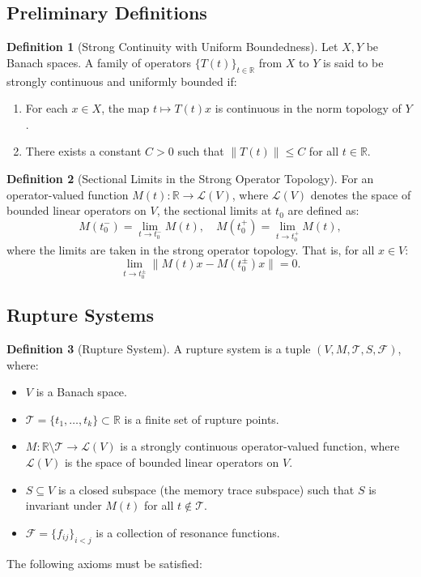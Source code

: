 \documentclass[12pt]{article}
\theoremstyle{definition}
\newtheorem{definition}{Definition}
\theoremstyle{plain}
\begin{document}
\subsection{Preliminary Definitions}

\begin{definition}[Strong Continuity with Uniform Boundedness]
Let \( X, Y \) be Banach spaces. A family of operators \( \{T(t)\}_{t \in \mathbb{R}} \) from \( X \) to \( Y \) is said to be strongly continuous and uniformly bounded if:
\begin{enumerate}
    \item For each \( x \in X \), the map \( t \mapsto T(t)x \) is continuous in the norm topology of \( Y \).
    \item There exists a constant \( C > 0 \) such that \( \|T(t)\| \leq C \) for all \( t \in \mathbb{R} \).
\end{enumerate}
\end{definition}

\begin{definition}[Sectional Limits in the Strong Operator Topology]
For an operator-valued function \( M(t): \mathbb{R} \to \mathcal{L}(V) \), where \( \mathcal{L}(V) \) denotes the space of bounded linear operators on \( V \), the sectional limits at \( t_0 \) are defined as:
\[
M(t_0^-) = \lim_{t \to t_0^-} M(t), \quad M(t_0^+) = \lim_{t \to t_0^+} M(t),
\]
where the limits are taken in the strong operator topology. That is, for all \( x \in V \):
\[
\lim_{t \to t_0^\pm} \|M(t)x - M(t_0^\pm)x\| = 0.
\]
\end{definition}

\subsection{Rupture Systems}

\begin{definition}[Rupture System]
A rupture system is a tuple \( (V, M, \mathcal{T}, S, \mathcal{F}) \), where:
\begin{itemize}
    \item \( V \) is a Banach space.
    \item \( \mathcal{T} = \{t_1,\ldots,t_k\} \subset \mathbb{R} \) is a finite set of rupture points.
    \item \( M: \mathbb{R} \setminus \mathcal{T} \to \mathcal{L}(V) \) is a strongly continuous operator-valued function, where \( \mathcal{L}(V) \) is the space of bounded linear operators on \( V \).
    \item \( S \subseteq V \) is a closed subspace (the memory trace subspace) such that \( S \) is invariant under \( M(t) \) for all \( t \notin \mathcal{T} \).
    \item \( \mathcal{F} = \{f_{ij}\}_{i<j} \) is a collection of resonance functions.
\end{itemize}
The following axioms must be satisfied:
\end{definition}
\end{document}
